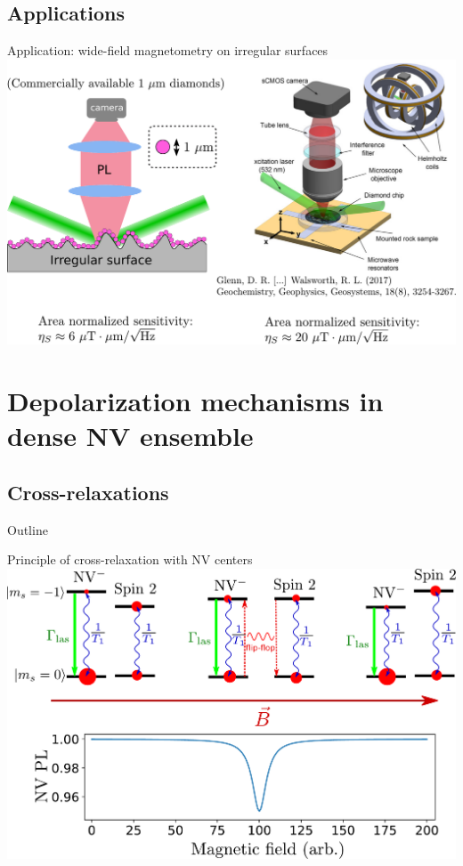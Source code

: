 \documentclass{beamer}
\begin{document}
\subsection{Applications}
\begin{frame}{Application: wide-field magnetometry on irregular surfaces}
\centering
\includegraphics[width=\textwidth,height=0.85\textheight,keepaspectratio]{Slide_applications_wide_field}
\end{frame}

\section{Depolarization mechanisms in dense NV ensemble}
\subsection{Cross-relaxations}
\begin{frame}{Outline}
\tableofcontents[currentsection]
\end{frame}
\begin{frame}{Principle of cross-relaxation with NV centers}
\centering
\includegraphics[width=\textwidth,height=0.8\textheight,keepaspectratio]{Slide_CR_presentation}
\end{frame}
\end{document}
